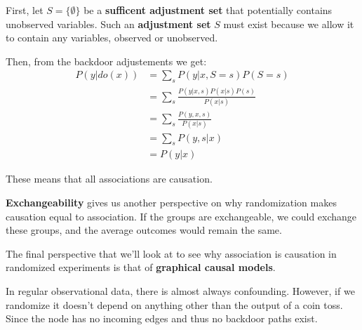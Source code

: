 First, let $S = \{\emptyset\}$ be a \textbf{sufficent adjustment set} that potentially contains unobserved variables. Such an \textbf{adjustment set} $S$ must exist because we allow it to contain any variables, observed or unobserved.

Then, from the backdoor adjustements we get:
\begin{equation}
    \begin{array}{ll}
        P(y|do(x)) & = \sum_s P(y|x, S = s)P(S = s)                \\
                   & = \sum_s \frac{P(y|x, s)P(x|s)P(s)}{P(x | s)} \\
                   & = \sum_s \frac{P(y, x, s)}{P(x | s)}          \\
                   & = \sum_s P(y, s| x)                           \\
                   & = P(y | x)
    \end{array}
\end{equation}

These means that all associations are causation.

\textbf{Exchangeability} gives us another perspective on why randomization makes causation equal to association. If the groups are exchangeable, we could exchange these groups, and the average outcomes would remain the same.

The final perspective that we'll look at to see why association is causation in randomized experiments is that of \textbf{graphical causal models}.

In regular observational data, there is almost always confounding. However, if we randomize  it doesn't depend on anything other than the output of a coin toss. Since the node has no incoming edges and thus no backdoor paths exist.